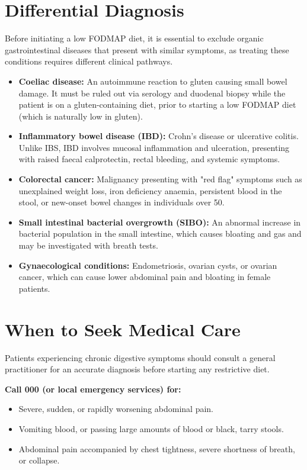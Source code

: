 \section*{Differential Diagnosis}
Before initiating a low FODMAP diet, it is essential to exclude organic gastrointestinal diseases that present with similar symptoms, as treating these conditions requires different clinical pathways.

\begin{itemize}
    \item \textbf{Coeliac disease:} An autoimmune reaction to gluten causing small bowel damage. It must be ruled out via serology and duodenal biopsy while the patient is on a gluten-containing diet, prior to starting a low FODMAP diet (which is naturally low in gluten).
    \item \textbf{Inflammatory bowel disease (IBD):} Crohn's disease or ulcerative colitis. Unlike IBS, IBD involves mucosal inflammation and ulceration, presenting with raised faecal calprotectin, rectal bleeding, and systemic symptoms.
    \item \textbf{Colorectal cancer:} Malignancy presenting with "red flag" symptoms such as unexplained weight loss, iron deficiency anaemia, persistent blood in the stool, or new-onset bowel changes in individuals over 50.
    \item \textbf{Small intestinal bacterial overgrowth (SIBO):} An abnormal increase in bacterial population in the small intestine, which causes bloating and gas and may be investigated with breath tests.
    \item \textbf{Gynaecological conditions:} Endometriosis, ovarian cysts, or ovarian cancer, which can cause lower abdominal pain and bloating in female patients.
\end{itemize}

\section*{When to Seek Medical Care}
Patients experiencing chronic digestive symptoms should consult a general practitioner for an accurate diagnosis before starting any restrictive diet. 

\textbf{Call 000 (or local emergency services) for:}
\begin{itemize}
    \item Severe, sudden, or rapidly worsening abdominal pain.
    \item Vomiting blood, or passing large amounts of blood or black, tarry stools.
    \item Abdominal pain accompanied by chest tightness, severe shortness of breath, or collapse.
\end{itemize}

